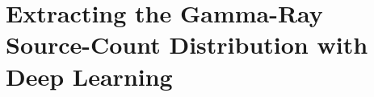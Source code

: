 \chapter{Extracting the Gamma-Ray Source-Count Distribution with Deep Learning}
\label{ch:6}
\glsresetall





